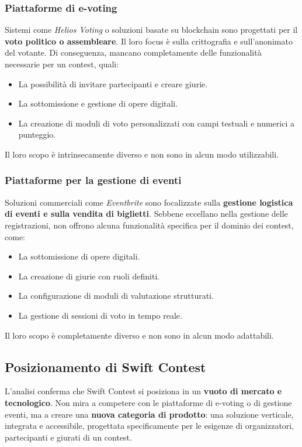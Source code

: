 \subsubsection{Piattaforme di e-voting}
Sistemi come \textit{Helios Voting} o soluzioni basate su blockchain sono progettati per il \textbf{voto politico o assembleare}.
Il loro focus è sulla crittografia e sull'anonimato del votante.
Di conseguenza, mancano completamente delle funzionalità necessarie per un contest, quali:
\begin{itemize}
	\item La possibilità di invitare partecipanti e creare giurie.
    \item La sottomissione e gestione di opere digitali.
    \item La creazione di moduli di voto personalizzati con campi testuali e numerici a punteggio.
\end{itemize}
Il loro scopo è intrinsecamente diverso e non sono in alcun modo utilizzabili.

\subsubsection{Piattaforme per la gestione di eventi}
Soluzioni commerciali come \textit{Eventbrite} sono focalizzate sulla \textbf{gestione logistica di eventi e sulla vendita di biglietti}.
Sebbene eccellano nella gestione delle registrazioni, non offrono alcuna funzionalità specifica per il dominio dei contest, come:
\begin{itemize}
    \item La sottomissione di opere digitali.
    \item La creazione di giurie con ruoli definiti.
    \item La configurazione di moduli di valutazione strutturati.
    \item La gestione di sessioni di voto in tempo reale.
\end{itemize}
Il loro scopo è completamente diverso e non sono in alcun modo adattabili.

\subsection{Posizionamento di Swift Contest}\label{subsec:posizionamento-di-swift-contest}
L'analisi conferma che Swift Contest si posiziona in un \textbf{vuoto di mercato e tecnologico}.
Non mira a competere con le piattaforme di e-voting o di gestione eventi, ma a creare una \textbf{nuova categoria di prodotto}: una soluzione verticale, integrata e accessibile, progettata specificamente per le esigenze di organizzatori, partecipanti e giurati di un contest.

